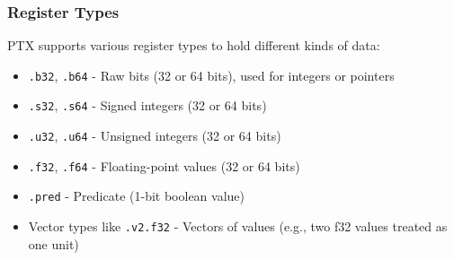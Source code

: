 \subsubsection{Register Types}

PTX supports various register types to hold different kinds of data:

\begin{itemize}
    \item \texttt{.b32}, \texttt{.b64} - Raw bits (32 or 64 bits), used for integers or pointers
    \item \texttt{.s32}, \texttt{.s64} - Signed integers (32 or 64 bits)
    \item \texttt{.u32}, \texttt{.u64} - Unsigned integers (32 or 64 bits)
    \item \texttt{.f32}, \texttt{.f64} - Floating-point values (32 or 64 bits)
    \item \texttt{.pred} - Predicate (1-bit boolean value)
    \item Vector types like \texttt{.v2.f32} - Vectors of values (e.g., two f32 values treated as one unit)
\end{itemize}


